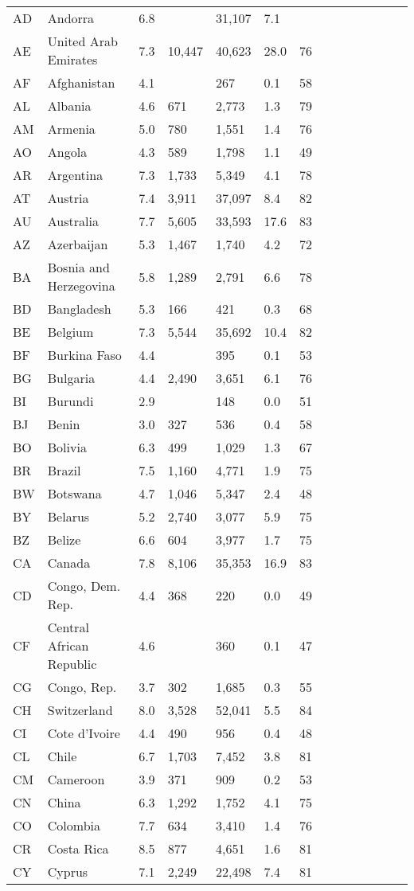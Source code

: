 \begin{scriptsize}
\begin{center}
\begin{longtable}{llllllllllllll}
AD&Andorra&6.8&&31,107&7.1&\\
AE&United Arab Emirates&7.3&10,447&40,623&28.0&76\\
AF&Afghanistan&4.1&&267&0.1&58\\
AL&Albania&4.6&671&2,773&1.3&79\\
AM&Armenia&5.0&780&1,551&1.4&76\\
AO&Angola&4.3&589&1,798&1.1&49\\
AR&Argentina&7.3&1,733&5,349&4.1&78\\
AT&Austria&7.4&3,911&37,097&8.4&82\\
AU&Australia&7.7&5,605&33,593&17.6&83\\
AZ&Azerbaijan&5.3&1,467&1,740&4.2&72\\
BA&Bosnia and Herzegovina&5.8&1,289&2,791&6.6&78\\
BD&Bangladesh&5.3&166&421&0.3&68\\
BE&Belgium&7.3&5,544&35,692&10.4&82\\
BF&Burkina Faso&4.4&&395&0.1&53\\
BG&Bulgaria&4.4&2,490&3,651&6.1&76\\
BI&Burundi&2.9&&148&0.0&51\\
BJ&Benin&3.0&327&536&0.4&58\\
BO&Bolivia&6.3&499&1,029&1.3&67\\
BR&Brazil&7.5&1,160&4,771&1.9&75\\
BW&Botswana&4.7&1,046&5,347&2.4&48\\
BY&Belarus&5.2&2,740&3,077&5.9&75\\
BZ&Belize&6.6&604&3,977&1.7&75\\
CA&Canada&7.8&8,106&35,353&16.9&83\\
CD&Congo, Dem. Rep.&4.4&368&220&0.0&49\\
CF&Central African Republic&4.6&&360&0.1&47\\
CG&Congo, Rep.&3.7&302&1,685&0.3&55\\
CH&Switzerland&8.0&3,528&52,041&5.5&84\\
CI&Cote d'Ivoire&4.4&490&956&0.4&48\\
CL&Chile&6.7&1,703&7,452&3.8&81\\
CM&Cameroon&3.9&371&909&0.2&53\\
CN&China&6.3&1,292&1,752&4.1&75\\
CO&Colombia&7.7&634&3,410&1.4&76\\
CR&Costa Rica&8.5&877&4,651&1.6&81\\
CY&Cyprus&7.1&2,249&22,498&7.4&81\\

\end{longtable}
\end{center}
\end{scriptsize}
